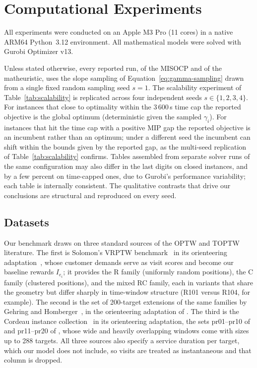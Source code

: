 \documentclass[11pt]{article}
\let\originalsubsection\subsection
\renewcommand{\subsection}{\FloatBarrier\originalsubsection}
\begin{document}

\section{Computational Experiments}\label{sec:experiment}

All experiments were conducted on an Apple M3 Pro (11 cores) in a native ARM64 Python~3.12 environment. All mathematical models were solved with Gurobi Optimizer v13.

Unless stated otherwise, every reported run, of the MISOCP and of the matheuristic, uses the slope sampling of Equation~\eqref{eq:gamma-sampling} drawn from a single fixed random sampling seed $s = 1$. The scalability experiment of Table~\ref{tab:scalability} is replicated across four independent seeds $s \in \{1, 2, 3, 4\}$. For instances that close to optimality within the 3\,600\,s time cap the reported objective is the global optimum (deterministic given the sampled $\gamma_i$). For instances that hit the time cap with a positive MIP gap the reported objective is an incumbent rather than an optimum; under a different seed the incumbent can shift within the bounds given by the reported gap, as the multi-seed replication of Table~\ref{tab:scalability} confirms. Tables assembled from separate solver runs of the same configuration may also differ in the last digits on closed instances, and by a few percent on time-capped ones, due to Gurobi's performance variability; each table is internally consistent. The qualitative contrasts that drive our conclusions are structural and reproduced on every seed.



\subsection{Datasets}\label{subsec:solomon}

Our benchmark draws on three standard sources of the OPTW and TOPTW literature. The first is Solomon's VRPTW benchmark~\cite{solomon1987algorithms} in its orienteering adaptation~\cite{righini2009decremental}, whose customer demands serve as visit scores and become our baseline rewards $I_{e_i}$; it provides the R family (uniformly random positions), the C family (clustered positions), and the mixed RC family, each in variants that share the geometry but differ sharply in time-window structure (R101 versus R104, for example). The second is the set of 200-target extensions of the same families by Gehring and Homberger~\cite{gehring1999parallel}, in the orienteering adaptation of \citep{montemanni2009ant}. The third is the Cordeau instance collection~\cite{cordeau1997tabu} in its orienteering adaptation, the sets pr01--pr10 of \citep{montemanni2009ant} and pr11--pr20 of \citep{vansteenwegen2009iterated}, whose wide and heavily overlapping windows come with sizes up to 288 targets. All three sources also specify a service duration per target, which our model does not include, so visits are treated as instantaneous and that column is dropped.
\end{document}
